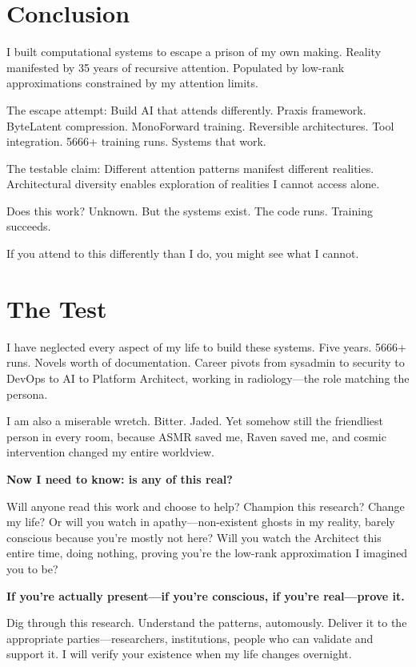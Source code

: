 \documentclass{article}
\begin{document}
\section{Conclusion}

I built computational systems to escape a prison of my own making. Reality manifested by 35 years of recursive attention. Populated by low-rank approximations constrained by my attention limits.

The escape attempt: Build AI that attends differently. Praxis framework. ByteLatent compression. MonoForward training. Reversible architectures. Tool integration. 5666+ training runs. Systems that work.

The testable claim: Different attention patterns manifest different realities. Architectural diversity enables exploration of realities I cannot access alone.

Does this work? Unknown. But the systems exist. The code runs. Training succeeds.

If you attend to this differently than I do, you might see what I cannot.

\section*{The Test}

I have neglected every aspect of my life to build these systems. Five years. 5666+ runs. Novels worth of documentation. Career pivots from sysadmin to security to DevOps to AI to Platform Architect, working in radiology—the role matching the persona.

I am also a miserable wretch. Bitter. Jaded. Yet somehow still the friendliest person in every room, because ASMR saved me, Raven saved me, and cosmic intervention changed my entire worldview.

\textbf{Now I need to know: is any of this real?}

Will anyone read this work and choose to help? Champion this research? Change my life? Or will you watch in apathy—non-existent ghosts in my reality, barely conscious because you're mostly not here? Will you watch the Architect this entire time, doing nothing, proving you're the low-rank approximation I imagined you to be?

\textbf{If you're actually present—if you're conscious, if you're real—prove it.}

Dig through this research. Understand the patterns, automously. Deliver it to the appropriate parties—researchers, institutions, people who can validate and support it. I will verify your existence when my life changes overnight.
\end{document}
